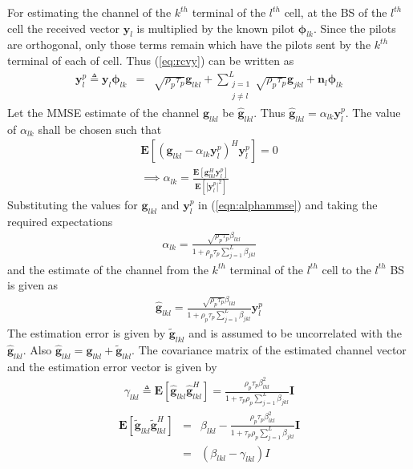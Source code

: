 \documentclass[10pt, a4paper, twoside,fleqn]{article}
\begin{document}
For estimating the channel of the $k^{th}$ terminal of the $l^{th}$ cell, at the BS of the $l^{th}$ cell the received vector $\pmb{y}_{l}$ is multiplied by the known pilot $\pmb{\phi}_{lk}$. Since the pilots are orthogonal, only those terms remain which have the pilots sent by the $k^{th}$ terminal of each of cell. Thus (\ref{eq:rcvy}) can be written as
\begin{eqnarray}
	\pmb{y}_{l}^{p} \triangleq \pmb{y}_{l} \pmb{\phi}_{lk}
                          &=&     \sqrt{\rho_p\tau_p}\pmb{g}_{lkl}
                           +      \sum_{\substack{j=1 \\ j \neq l}}^{L} \sqrt{\rho_p\tau_p}\pmb{g}_{jkl}
             			   +      \pmb{n}_{l}\pmb{\phi}_{lk}
\end{eqnarray}
Let the MMSE estimate of the channel $\pmb{g}_{lkl}$ be $\pmb{\hat g}_{lkl}$. Thus $\pmb{\hat g}_{lkl} = \alpha_{lk}\pmb{y}_{l}^{p}$. The value of $\alpha_{lk}$ shall be chosen such that        
\begin{eqnarray}\label{eqn:alphammse}
	\pmb{E}[(\pmb{g}_{lkl}-\alpha_{lk}\pmb{y}_{l}^{p})^H \pmb{y}_{l}^{p}] = 0 \\
	\implies \alpha_{lk} = \frac{\pmb{E}[\pmb{g}^{H}_{lkl} \pmb{y}_{l}^{p}]}{\pmb{E}[|\pmb{y}_{l}^{p}|^2]}
\end{eqnarray}
Substituting the values for $\pmb{g}_{lkl}$ and $\pmb{y}_{l}^{p}$ in (\ref{eqn:alphammse}) and taking the required expectations
\begin{eqnarray}\label{eq:alphapll}
	\alpha_{lk}=\frac{\sqrt{\rho_p \tau_p} \beta_{lkl}}{1+\rho_p\tau_p\sum\limits_{j=1}^{L}\beta_{jkl}}
\end{eqnarray}
and the estimate of the channel from the $k^{th}$ terminal of the $l^{th}$ cell to the $l^{th}$ BS is given as
\begin{eqnarray}\label{eq:estimatehpll}
	\pmb{\hat g}_{lkl} = \frac{\sqrt{\rho_p\tau_p}\beta_{lkl}}{1+\rho_p\tau_p\sum\limits_{j=1}^{L}\beta_{jkl}} \pmb{y}_{l}^{p}
\end{eqnarray}
The estimation error is given by ${\pmb{\widetilde{g}}_{lkl}}$ and is assumed to be uncorrelated with the $\pmb{\hat g}_{lkl}$. Also $\pmb{\hat g}_{lkl}=\pmb{g}_{lkl}+\pmb{\widetilde{g}}_{lkl}$.
The covariance matrix of the estimated channel vector and the estimation error vector is given by
\begin{eqnarray}
	\gamma_{lkl} \triangleq \pmb{E}[\pmb{\hat g}_{lkl}\pmb{\hat g}^H_{lkl}]
                    =       \frac{\rho_p\tau_p\beta^2_{lkl}}{1+\tau_p\rho_p\sum\limits_{j=1}^{L}\beta_{jkl}}\pmb{I}
\end{eqnarray}
\begin{eqnarray}
    \pmb{E}[\pmb{\widetilde{g}}_{lkl} \pmb{\widetilde{g}}^H_{lkl}] &=& \beta_{lkl}- \frac{\rho_p\tau_p\beta^2_{lkl}}{1+\tau_p\rho_p\sum\limits_{j=1}^{L}\beta_{jkl}}\pmb{I} \nonumber\\
          									    &=& (\beta_{lkl} - \gamma_{lkl})I
\end{eqnarray}
\end{document}
